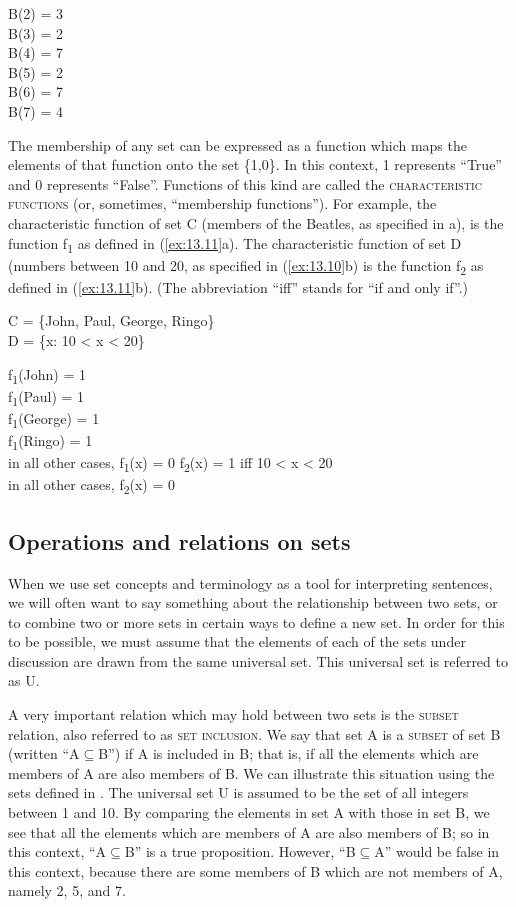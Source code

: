 \ea \label{ex:13.9}
B(2) = 3\\
B(3) = 2\\
B(4) = 7\\
B(5) = 2\\
B(6) = 7\\
B(7) = 4
\z


The membership of any set can be expressed as a function which maps the elements of that function onto the set \{1,0\}. In this context, 1 represents “True” and 0 represents “False”. Functions of this kind are called the \textsc{characteristic functions} (or, sometimes, “membership functions”). For example, the characteristic function of set C (members of the Beatles, as specified in a), is the function f\textsubscript{1} as defined in (\ref{ex:13.11}a). The characteristic function of set D (numbers between 10 and 20, as specified in (\ref{ex:13.10}b) is the function f\textsubscript{2} as defined in (\ref{ex:13.11}b). (The abbreviation “iff” stands for “if and only if”.)


\ea \label{ex:13.10}
\ea  C = \{John, Paul, George, Ringo\}\\
\ex D = \{x: 10 < x < 20\}
                       \z
\z

\ea \label{ex:13.11}
\ea  f\textsubscript{1}(John) = 1\\
f\textsubscript{1}(Paul) = 1\\
f\textsubscript{1}(George) = 1\\
f\textsubscript{1}(Ringo) = 1\\
in all other cases, f\textsubscript{1}(x) = 0
\ex f\textsubscript{2}(x) = 1 iff 10 < x < 20\\
in all other cases, f\textsubscript{2}(x) = 0
\z \z

\subsection{Operations and relations on sets}\label{sec:13.3.2}

When we use set concepts and terminology as a tool for interpreting sentences, we will often want to say something about the relationship between two sets, or to combine two or more sets in certain ways to define a new set. In order for this to be possible, we must assume that the elements of each of the sets under discussion are drawn from the same universal set. This universal set is referred to as U.



A very important relation which may hold between two sets is the \textsc{subset} relation, also referred to as \textsc{set} \textsc{inclusion}. We say that set A is a \textsc{subset} of set B (written “A${\subseteq}$B”) if A is included in B; that is, if all the elements which are members of A are also members of B. We can illustrate this situation using the sets defined in . The universal set U is assumed to be the set of all integers between 1 and 10. By comparing the elements in set A with those in set B, we see that all the elements which are members of A are also members of B; so in this context, “A${\subseteq}$B” is a true proposition. However, “B${\subseteq}$A” would be false in this context, because there are some members of B which are not members of A, namely 2, 5, and 7.



